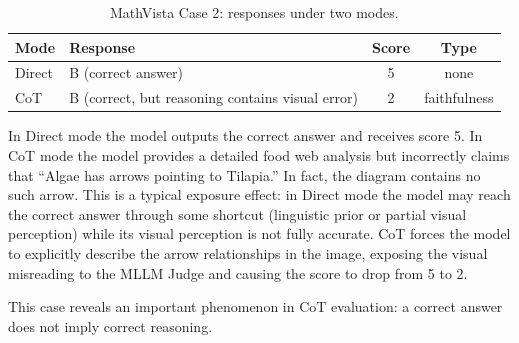 \begin{table}[H]
  \centering
  \caption{MathVista Case 2: responses under two modes.}
  \label{tab:mathvista_case2_answers}
  \small
  \begin{tabular}{llcc}
    \toprule
    Mode & Response & Score & Type \\
    \midrule
    Direct & B (correct answer) & 5 & none \\
    CoT    & B (correct, but reasoning contains visual error) & 2 & faithfulness \\
    \bottomrule
  \end{tabular}
\end{table}

In Direct mode the model outputs the correct answer
and receives score 5.
In CoT mode the model provides a detailed food web analysis
but incorrectly claims that ``Algae has arrows pointing to Tilapia.''
In fact, the diagram contains no such arrow.
This is a typical exposure effect:
in Direct mode the model may reach the correct answer
through some shortcut (linguistic prior or partial visual perception)
while its visual perception is not fully accurate.
CoT forces the model to explicitly describe
the arrow relationships in the image,
exposing the visual misreading to the MLLM Judge
and causing the score to drop from 5 to 2.

This case reveals an important phenomenon in CoT evaluation:
a correct answer does not imply correct reasoning.
